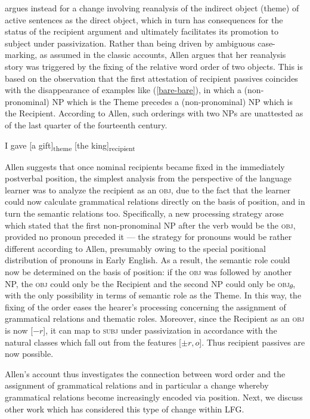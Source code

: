 \documentclass[output=paper,hidelinks]{langscibook}
\begin{document}
\citet{Allen01} argues instead for a change involving reanalysis of the indirect object (theme) of active sentences as the direct object, which in turn has consequences for the status of the recipient argument and ultimately facilitates its promotion to subject under passivization. Rather than being driven by ambiguous case-marking, as assumed in the classic accounts, Allen argues that her reanalysis story was triggered by the fixing of the relative word order of two objects. This is based on the observation that the first attestation of recipient passives coincides with the disappearance of examples like (\ref{bare-bare}), in which a (non-pronominal) NP which is the Theme precedes a (non-pronominal) NP which is the Recipient. According to Allen, such orderings with two NPs are unattested as of the last quarter of the fourteenth century. 

\begin{exe}
\ex \label{bare-bare}
I gave [a gift]\textsubscript{theme} [the king]\textsubscript{recipient}  %
\end{exe}


Allen suggests that once nominal recipients became fixed in the immediately postverbal position, the simplest analysis from the perspective of the language learner was to analyze the recipient as an \textsc{obj}, due to the fact that the learner could now calculate grammatical relations directly on the basis of position, and in turn the semantic relations too. Specifically, a new processing strategy arose which stated that the first non-pronominal NP after the verb would be the \textsc{obj}, provided no pronoun preceded it ---  the strategy for pronouns would be rather different according to Allen, presumably owing to the special positional distribution of pronouns in Early English. As a result, the semantic role could now be determined on the basis of position: if the \textsc{obj} was followed by another NP, the \textsc{obj} could only be the Recipient and the second NP could only be \textsc{obj}\textsubscript{$\theta$}, with the only possibility in terms of semantic role as the Theme. In this way, the fixing of the order eases the hearer's processing concerning the assignment of grammatical relations and thematic roles. Moreover, since the Recipient as an \textsc{obj} is now [$-r$], it can map to \textsc{subj} under passivization in accordance with the natural classes which fall out from the features [${\pm}r,o$]. Thus recipient passives are now possible.


Allen's account thus investigates the connection between word order and the assignment of grammatical relations and in particular a change whereby grammatical relations become increasingly encoded via position. Next, we discuss other work which has considered this type of change within LFG.
\end{document}
